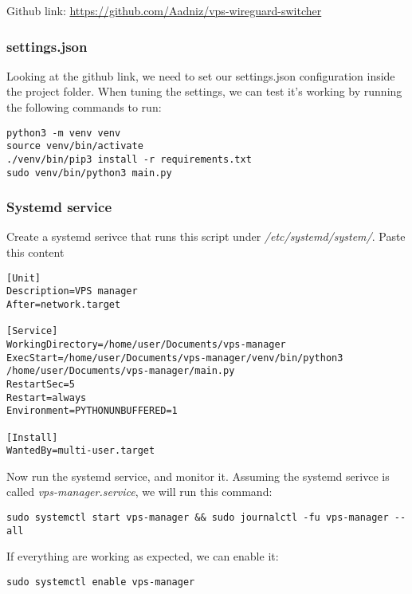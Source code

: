 \documentclass[letterpaper, 11pt]{article}
\begin{document}
Github link: \url{https://github.com/Aadniz/vps-wireguard-switcher}

\subsubsection{settings.json}
\label{sec:orgb27e8f2}
Looking at the github link, we need to set our settings.json configuration inside the project folder.
When tuning the settings, we can test it's working by running the following commands to run:

\begin{verbatim}
python3 -m venv venv
source venv/bin/activate
./venv/bin/pip3 install -r requirements.txt
sudo venv/bin/python3 main.py
\end{verbatim}

\subsubsection{Systemd service}
\label{sec:org1f88bd2}

Create a systemd serivce that runs this script under \textit{/etc/systemd/system/}.
Paste this content
\begin{verbatim}
[Unit]
Description=VPS manager
After=network.target

[Service]
WorkingDirectory=/home/user/Documents/vps-manager
ExecStart=/home/user/Documents/vps-manager/venv/bin/python3 /home/user/Documents/vps-manager/main.py
RestartSec=5
Restart=always
Environment=PYTHONUNBUFFERED=1

[Install]
WantedBy=multi-user.target
\end{verbatim}

Now run the systemd service, and monitor it. Assuming the systemd serivce is called \textit{vps-manager.service}, we will run this command:

\begin{verbatim}
sudo systemctl start vps-manager && sudo journalctl -fu vps-manager --all
\end{verbatim}

If everything are working as expected, we can enable it:
\begin{verbatim}
sudo systemctl enable vps-manager
\end{verbatim}
\end{document}
